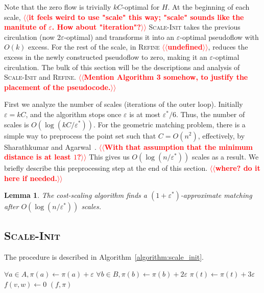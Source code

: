 \documentclass[11pt]{article}
\makeatletter
\def\eps{\varepsilon}
\theoremstyle{plain}
\newtheorem{lemma}{Lemma}[section]
\numberwithin{figure}{section}
\def\n@te#1{\textsf{\boldmath \textbf{$\langle\!\langle$#1$\rangle\!\rangle$}}\leavevmode}
\def\note#1{\textcolor{red}{\n@te{#1}}}
\makeatother
\begin{document}
Note that the zero flow is trivially $kC$-optimal for $H$.
At the beginning of each scale, \note{it feels weird to use "scale" this way; "scale" sounds like the manitute of $\eps$.  How about "iteration"?} \textsc{Scale-Init} takes the previous
circulation (now $2\eps$-optimal) and transforms it into an $\eps$-optimal
pseudoflow with $O(k)$ excess.
For the rest of the scale, in \textsc{Refine} \note{undefined}, reduces the excess in the newly constructed
pseudoflow to zero, making it an $\eps$-optimal circulation.
The bulk of this section will be the descriptions and analysis of \textsc{Scale-Init} and
\textsc{Refine}.
\note{Mention Algorithm 3 somehow, to justify the placement of the pseudocode.}

First we analyze the number of scales (iterations of the outer loop).
Initially $\eps = kC$, and the algorithm stops once $\eps$ is at most $\eps^*/6$.
Thus, the number of scales is $O(\log(kC/\eps^*))$.
For the geometric matching problem, there is a simple way to preprocess the point
set such that $C = O(n^2)$, effectively, by Sharathkumar and Agarwal~\cite{SA12}.
\note{With that assumption that the minimum distance is at least $1$?}
This gives us $O(\log(n/\eps^*))$ scales as a result.
We briefly describe this preprocessing step at the end of this section. \note{where? do it here if needed.}

\begin{lemma}
\label{lemma:goldberg_scales}
The cost-scaling algorithm finds a $(1 + \eps^*)$-approximate matching after
$O(\log(n/\eps^*))$ scales.
\end{lemma}

\subsection{\textsc{Scale-Init}}

The procedure is described in Algorithm~\ref{algorithm:scale_init}.

\begin{figure*}[h]
\centering
\begin{minipage}{.5\linewidth}
\begin{algorithm}[H]
\caption{Scale Initialization}
\label{algorithm:scale_init}
\begin{algorithmic}[1]
	\State $\forall a \in A, \pi(a) \gets \pi(a) + \eps$
	\State $\forall b \in B, \pi(b) \gets \pi(b) + 2\eps$
	\State $\pi(t) \gets \pi(t) + 3\eps$
		\If{$c_\pi(w, v) < -\eps$}
			\State $f(v, w) \gets 0$
		\EndIf
	\EndFor
	\State\Return $(f, \pi)$
\EndFunction
\end{algorithmic}
\end{algorithm}
\end{minipage}
\end{figure*}
\end{document}
